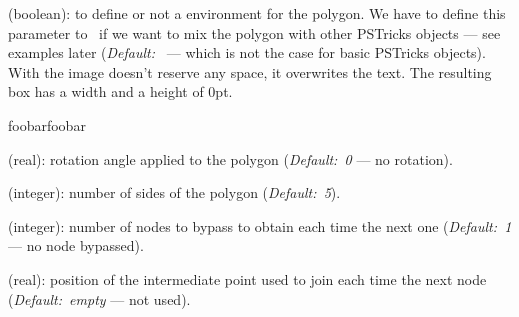 \documentclass[11pt,english,BCOR10mm,DIV12,bibliography=totoc,parskip=false,smallheadings
    headexclude,footexclude,oneside]{pst-doc}
\begin{document}
\begin{compactdesc}
  \item [\Lkeyword{PstPicture}] (boolean): to define or not a 
  environment for the polygon. We have to define this parameter to
  \false\ if we want to mix the polygon with other PSTricks objects
  --- see examples later
  (\emph{Default:~\true} --- which is not the case for basic PSTricks
  objects). With  the image doesn't reserve
  any space, it overwrites the text. The resulting box has a width and a height of 0pt.

\bigskip
\begin{LTXexample}[pos=t]
  foo\PstPolygon bar\hfill foo\PstPolygon[PstPicture=false] bar
\end{LTXexample}

\bigskip
  \item [\Lkeyword{PolyRotation}] (real): rotation angle applied to the polygon
  (\emph{Default:~0} --- no rotation).

\bigskip
\begin{LTXexample}[pos=t]
  \PstPolygon\hfill
  \PstPolygon[PolyRotation=18]\hfill
  \PstPolygon[PolyRotation=36]\hfill
  \PstPolygon[PolyRotation=45]
\end{LTXexample}

\bigskip
  \item [\Lkeyword{PolyNbSides}] (integer): number of sides of the polygon
  (\emph{Default:~5}).

\bigskip
\begin{LTXexample}[pos=t]
  \PstPolygon\hfill
  \PstPolygon[PolyNbSides=3]\hfill
  \PstPolygon[PolyNbSides=4]\hfill
  \PstPolygon[PolyNbSides=5]\hfill
  \PstPolygon[PolyNbSides=8]\hfill
  \PstPolygon[PolyNbSides=50]
\end{LTXexample}

\bigskip
  \item [\Lkeyword{PolyOffset}] (integer): number of nodes to bypass to obtain each
  time the next one (\emph{Default:~1} --- no node bypassed).

\bigskip
\begin{LTXexample}[pos=t]
  \PstPolygon
  \PstPolygon[PolyOffset=2]
  \PstPolygon[PolyOffset=3]
  \PstPolygon[PolyNbSides=7,PolyOffset=2]
  \PstPolygon[PolyNbSides=9,PolyOffset=4]
  \PstPolygon[PolyNbSides=17,PolyOffset=6]
\end{LTXexample}

\bigskip
  \item [\Lkeyword{PolyIntermediatePoint}] (real): position of the intermediate point
  used to join each time the next node (\emph{Default:~empty} --- not used).


\end{compactdesc}
\end{document}
